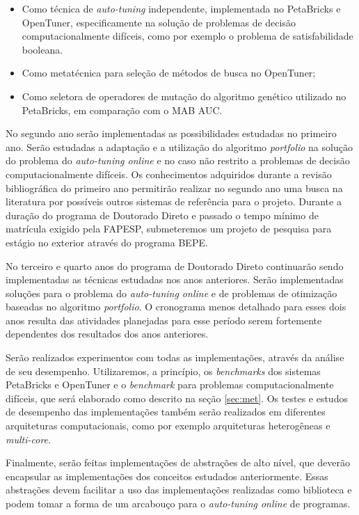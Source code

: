 \documentclass[a4paper, 12pt]{article}
\begin{document}
\begin{itemize}
    \item Como técnica de \emph{auto-tuning} independente, implementada
        no PetaBricks e OpenTuner, especificamente na solução de problemas
        de decisão computacionalmente difíceis, como por exemplo o problema
        de satisfabilidade booleana.
    \item Como metatécnica para seleção de métodos de busca no OpenTuner;
    \item Como seletora de operadores de mutação do algoritmo genético
        utilizado no PetaBricks, em comparação com o MAB AUC.
\end{itemize}

No segundo ano serão implementadas as possibilidades estudadas no primeiro ano.
Serão estudadas a adaptação e a utilização do algoritmo \emph{portfolio} na
solução do problema do \emph{auto-tuning online} e no caso não restrito a
problemas de decisão computacionalmente difíceis. Os conhecimentos adquiridos
durante a revisão bibliográfica do primeiro ano permitirão realizar no segundo
ano uma busca na literatura por possíveis outros sistemas de referência para o
projeto. Durante a duração do programa de Doutorado Direto e passado o tempo
mínimo de matrícula exigido pela FAPESP, submeteremos um projeto de pesquisa
para estágio no exterior através do programa BEPE.

No terceiro e quarto anos do programa de Doutorado Direto continuarão sendo
implementadas as técnicas estudadas nos anos anteriores. Serão implementadas
soluções para o problema do \emph{auto-tuning online} e de problemas de
otimização baseadas no algoritmo \emph{portfolio}. O cronograma menos detalhado
para esses dois anos resulta das atividades planejadas para esse período serem
fortemente dependentes dos resultados dos anos anteriores.

Serão realizados experimentos com todas as implementações, através da análise
de seu desempenho. Utilizaremos, a princípio, os \emph{benchmarks} dos sistemas
PetaBricks e OpenTuner e o \emph{benchmark} para problemas computacionalmente
difíceis, que será elaborado como descrito na seção \ref{sec:met}.
Os testes e estudos de desempenho das implementações também serão realizados
em diferentes arquiteturas computacionais, como por exemplo arquiteturas
heterogêneas e \emph{multi-core}.

Finalmente, serão feitas implementações de abstrações de alto
nível, que deverão encapsular as implementações dos conceitos estudados
anteriormente. Essas abstrações devem facilitar a uso das implementações
realizadas como biblioteca e podem tomar a forma de um arcabouço para o
\emph{auto-tuning online} de programas.
\end{document}
